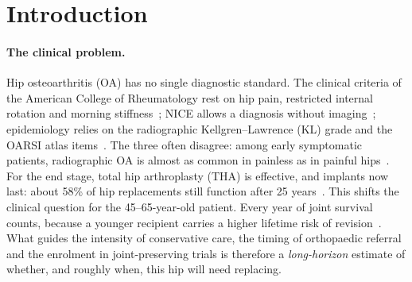 \section{Introduction}
\label{sec:intro}

\paragraph{The clinical problem.}
Hip osteoarthritis (OA) has no single diagnostic standard. The clinical criteria of the American College of Rheumatology
rest on hip pain, restricted internal rotation and morning stiffness~\cite{altman1991acr}; NICE allows a diagnosis without
imaging~\cite{nice2022oa}; epidemiology relies on the radiographic Kellgren--Lawrence (KL) grade and the OARSI atlas
items~\cite{altman2007oarsi}. The three often disagree: among early symptomatic patients, radiographic OA is almost as
common in painless as in painful hips~\cite{rondas2022}. For the end stage, total hip arthroplasty (THA) is
effective, and implants now last: about 58\% of hip replacements still function after 25 years~\cite{evans2019hip}.
This shifts the clinical question for the 45--65-year-old patient. Every year of joint survival counts, because a younger
recipient carries a higher lifetime risk of revision~\cite{bayliss2017revision}. What guides the intensity of conservative
care, the timing of orthopaedic referral and the enrolment in joint-preserving trials is therefore a \emph{long-horizon}
estimate of whether, and roughly when, this hip will need replacing.

